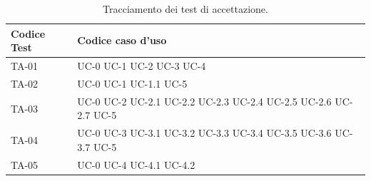 \documentclass[8pt]{article}
\begin{document}
\begin{longtable}{|>{\centering}p{4cm}|>{\centering\arraybackslash}p{4cm}|}
\hline
\rowcolor{white}
\textbf{Codice Test} & \textbf{Codice caso d'uso} \\
\hline
\endfirsthead
\rowcolor{white}
\caption{Tracciamento dei test di accettazione.}
\label{table:Tracciamento dei test di accettazione}
\endlastfoot
    TA-01 & UC-0 \newline
            UC-1 \newline
            UC-2 \newline
            UC-3 \newline
            UC-4 
    \\
    \hline
    TA-02 & UC-0 \newline
            UC-1 \newline
            UC-1.1 \newline
            UC-5
    \\
    \hline 
    TA-03 & UC-0 \newline
            UC-2 \newline
            UC-2.1 \newline
            UC-2.2 \newline
            UC-2.3 \newline
            UC-2.4 \newline
            UC-2.5 \newline
            UC-2.6 \newline
            UC-2.7 \newline
            UC-5
    \\
    \hline
    TA-04 & UC-0 \newline
            UC-3 \newline 
            UC-3.1 \newline
            UC-3.2 \newline
            UC-3.3 \newline
            UC-3.4 \newline
            UC-3.5 \newline
            UC-3.6 \newline
            UC-3.7 \newline
            UC-5
    \\
    \hline
    TA-05 & UC-0 \newline
            UC-4 \newline 
            UC-4.1 \newline
            UC-4.2 \newline

\end{longtable}
\end{document}
